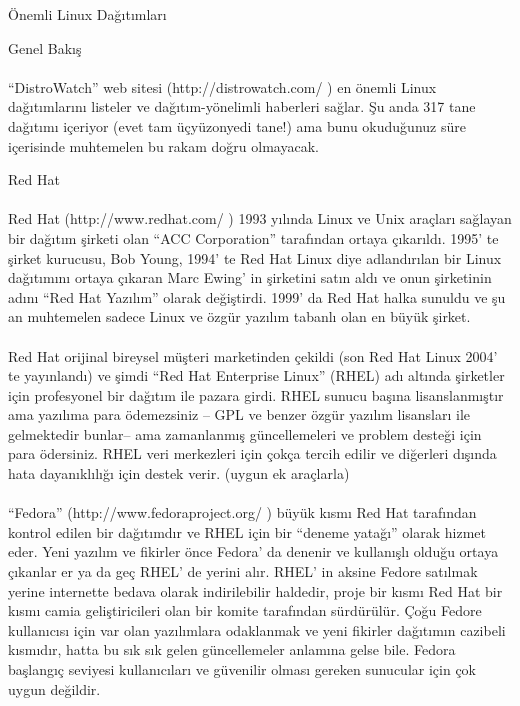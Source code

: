 \documentclass[10pt,a5paper]{book}
\begin{document}
\begin{section}{Önemli Linux Dağıtımları}
\begin{subsection}{Genel Bakış}
\paragraph{}{“DistroWatch” web sitesi (http://distrowatch.com/ ) en önemli Linux dağıtımlarını listeler ve dağıtım-yönelimli haberleri sağlar. Şu anda 317 tane dağıtımı içeriyor (evet tam üçyüzonyedi tane!) ama bunu okuduğunuz süre içerisinde muhtemelen bu rakam doğru olmayacak.}
\end{subsection}
\begin{subsection}{Red Hat}
\paragraph{}{Red Hat (http://www.redhat.com/ ) 1993 yılında Linux ve Unix araçları sağlayan bir dağıtım şirketi olan “ACC Corporation” tarafından ortaya çıkarıldı. 1995' te şirket kurucusu, Bob Young, 1994' te Red Hat Linux diye adlandırılan bir Linux dağıtımını ortaya çıkaran Marc Ewing' in şirketini satın aldı ve onun şirketinin adını “Red Hat Yazılım” olarak değiştirdi. 1999' da Red Hat halka sunuldu ve şu an muhtemelen sadece Linux ve özgür yazılım tabanlı olan en büyük şirket.}
\paragraph{}{Red Hat orijinal bireysel müşteri marketinden çekildi (son Red Hat Linux 2004' te yayınlandı) ve şimdi “Red Hat Enterprise Linux” (RHEL) adı altında şirketler için profesyonel bir dağıtım ile pazara girdi. RHEL sunucu başına lisanslanmıştır ama yazılıma para ödemezsiniz – GPL ve benzer özgür yazılım lisansları ile gelmektedir bunlar-- ama zamanlanmış güncellemeleri ve problem desteği için para ödersiniz. RHEL veri merkezleri için çokça tercih edilir ve diğerleri dışında hata dayanıklılığı için destek verir. (uygun ek araçlarla)}
\paragraph{}{“Fedora” (http://www.fedoraproject.org/ ) büyük kısmı Red Hat tarafından kontrol edilen bir dağıtımdır ve RHEL için bir “deneme yatağı” olarak hizmet eder. Yeni yazılım ve fikirler önce Fedora' da denenir ve kullanışlı olduğu ortaya çıkanlar er ya da geç RHEL' de yerini alır. RHEL' in aksine Fedore satılmak yerine internette bedava olarak indirilebilir haldedir, proje bir kısmı Red Hat bir kısmı camia geliştiricileri olan bir komite tarafından sürdürülür. Çoğu Fedore kullanıcısı için var olan yazılımlara odaklanmak ve yeni fikirler dağıtımın cazibeli kısmıdır, hatta bu sık sık gelen güncellemeler anlamına gelse bile. Fedora başlangıç seviyesi kullanıcıları ve güvenilir olması gereken sunucular için çok uygun değildir.}

\end{subsection}
\end{section}
\end{document}
